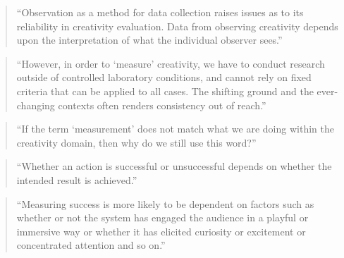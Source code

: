 \begin{quote}
  ``Observation as a method for data collection raises issues as to its reliability in creativity evaluation. Data from observing creativity depends upon the interpretation of what the individual observer sees.'' \parencite[p.22]{Candy2012}
\end{quote}

\begin{quote}
  ``However, in order to ‘measure’ creativity, we have to conduct research outside of controlled laboratory conditions, and cannot rely on fixed criteria that can be applied to all cases. The shifting ground and the ever-changing contexts often renders consistency out of reach.'' \parencite[p.22]{Candy2012}
\end{quote}

\begin{quote}
  ``If the term `measurement' does not match what we are doing within the creativity domain, then why do we still use this word?'' \parencite[p.22]{Candy2012}
\end{quote}

\begin{quote}
  ``Whether an action is successful or unsuccessful depends on whether the intended result is achieved.'' \parencite[p.23]{Candy2012}
\end{quote}

\begin{quote}
  ``Measuring success is more likely to be dependent on factors such as whether or not the system has engaged the audience in a playful or immersive way or whether it has elicited curiosity or excitement or concentrated attention and so on.'' \parencite[p.23]{Candy2012}
\end{quote}



